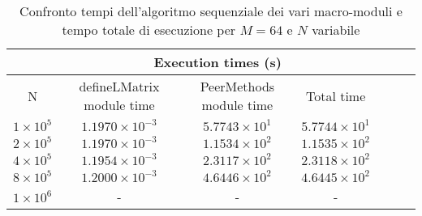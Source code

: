 \begin{table}[ht!]
    \begin{center}
        \renewcommand{\arraystretch}{1.5}
        \begin{adjustbox}{width=.9\textwidth}
            \begin{tabular}{ |c|c|c|c|c|c|c| }
                \hline
                \multicolumn{1}{|c}{} & \multicolumn{3}{|c|}{Execution times (s)} \\
                \hline 
                N & defineLMatrix module time & PeerMethods module time & Total time \\
                \hline 
                $1 \times 10^5$ & $1.1970 \times 10^{-3}$ & $5.7743 \times 10^{1}$  & $5.7744 \times 10^{1}$ \\ 
                \hline 
                $2 \times 10^5$ & $1.1970 \times 10^{-3}$ & $1.1534 \times 10^{2}$ & $1.1535 \times 10^{2}$ \\ 
                \hline 
                $4 \times 10^5$ & $1.1954 \times 10^{-3}$ & $2.3117 \times 10^{2}$ & $2.3118 \times 10^{2}$ \\ 
                \hline 
                $8 \times 10^5$ & $1.2000 \times 10^{-3}$ & $4.6446 \times 10^{2}$ & $4.6445 \times 10^{2}$ \\
                \hline 
                $1 \times 10^6$ & - & - & - \\ 
                \hline 
            \end{tabular}
        \end{adjustbox}
    \end{center}
    \caption{Confronto tempi dell'algoritmo sequenziale dei vari macro-moduli e tempo totale di esecuzione per $M = 64$ e $N$ variabile} 
    \label{tab:macro_module_time}
\end{table}

